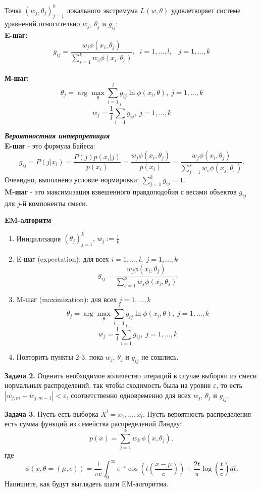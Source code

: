 \begin{theorem}

Точка $(w_j, \theta_j)_{j=1}^k$ локального экстремума $L(w,\theta)$ удовлетворяет системе уравнений относительно $w_j$, $\theta_j$ и $g_{ij}$:
\\
\textbf{E-шаг: }
$$g_{ij} = \frac{w_j \phi(x_i,\theta_j)}{\sum_{s=1}^k w_s \phi(x_i, \theta_s)}, \; \; i=1,...,l, \;\;\; j = 1,...,k$$
\\
\textbf{М-шаг: }
$$\theta_j = \arg \max_\theta \sum_{i=1}^l g_{ij} \ln \phi(x_i, \theta), \; j=1,...,k $$
$$w_j = \frac{1}{l} \sum_{i=1}^l g_{ij}, \; j=1,...,k$$

\end{theorem}

\textbf{\textit{Вероятностная интерпретация}}
\\
\textbf{E-шаг} - это формула Байеса:
$$g_{ij} = P(j|x_i) = \frac{P(j)p(x_i|j)}{p(x_i)} = \frac{w_j \phi(x_i, \theta_j)}{p(x_i)} = \frac{w_j \phi(x_i,\theta_j)}{\sum_{j=1}^s w_s \phi(x_j, \theta_s)}.$$
Очевидно, выполнено условие нормировки: $\sum_{j=1}^k g_{ij} = 1.$
\\
\textbf{M-шаг} - это максимизация взвешенного правдоподобия с весами объектов $g_{ij}$ для $j$-й компоненты смеси.


\textbf{EM-aлгоритм}
\begin{enumerate}
    \item Иницилизация $(\theta_j)_{j=1}^k, \, w_j:=\frac{1}{k}$
    \item E-шаг (expectation): для всех $i=1,...,l, \; j = 1,...,k$
    $$g_{ij} = \frac{w_j \phi(x_i,\theta_j)}{\sum_{s=1}^k w_s \phi(x_i, \theta_s)}$$
    \item M-шаг (maximization): для всех $j=1,...,k$
    $$\theta_j = \arg \max_\theta \sum_{i=1}^l g_{ij} \ln \phi(x_i, \theta), \; j=1,...,k $$
$$w_j = \frac{1}{l} \sum_{i=1}^l g_{ij}, \; j=1,...,k$$
    \item Повторить пункты 2-3, пока $w_j$, $\theta_j$ и $g_{ij}$ не сошлись.
    
\end{enumerate}

\textbf{Задача 2.} Оценить необходимое количество итераций в случае выборки из смеси нормальных распределений, так чтобы сходимость была на уровне $\varepsilon$, то есть $|w_{j,m} - w_{j,m-1}|<\varepsilon$, соответственно одновременно для всех $w_j$, $\theta_j$ и $g_{ij}$.

\textbf{Задача 3.} Пусть есть выборка $X^l = {x_1,...,x_l}$. Пусть вероятность распределения есть сумма функций из семейства распределений Ландау:
$$p(x) = \sum_{j=1}^k w_k \, \phi(x,\theta_j),$$
где $$\phi(x,\theta = (\mu,c)) = \frac{1}{\pi c} \int_0^\infty e^{-t} \cos \left(t \left(\frac{x-\mu}{c}\right)\right) +\frac{2t}{\pi} \log\left(\frac{t}{c}\right) dt.$$
Напишите, как будут выглядеть шаги EM-алгоритма.
 
